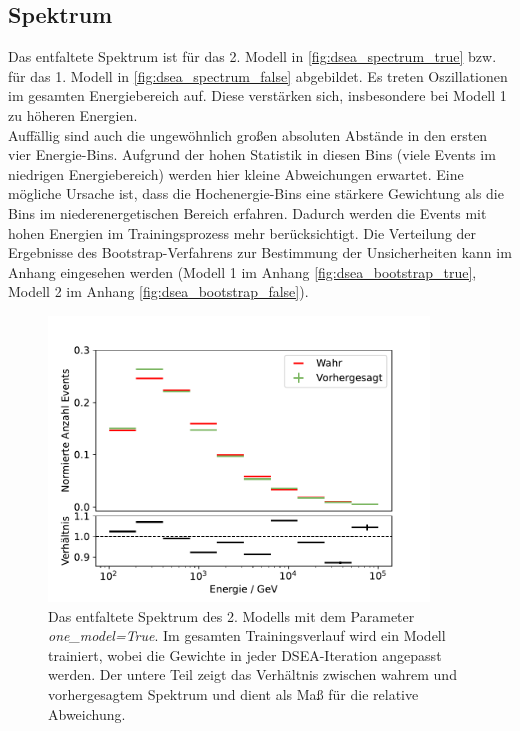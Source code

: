 \subsection{Spektrum} \label{sec:dsea_spectrum}
Das entfaltete Spektrum ist für das 2. Modell in \autoref{fig:dsea_spectrum_true} bzw. für das 1. Modell in \autoref{fig:dsea_spectrum_false} abgebildet.
Es treten Oszillationen im gesamten Energiebereich auf.
Diese verstärken sich, insbesondere bei Modell 1 zu höheren Energien.
\\
Auffällig sind auch die ungewöhnlich großen absoluten Abstände in den ersten vier Energie-Bins.
Aufgrund der hohen Statistik in diesen Bins (viele Events im niedrigen Energiebereich) werden hier kleine Abweichungen erwartet.
Eine mögliche Ursache ist, dass die Hochenergie-Bins eine stärkere Gewichtung als die Bins im niederenergetischen Bereich erfahren.
Dadurch werden die Events mit hohen Energien im Trainingsprozess mehr berücksichtigt.
Die Verteilung der Ergebnisse des Bootstrap-Verfahrens zur Bestimmung der Unsicherheiten kann im Anhang eingesehen werden (Modell 1 im Anhang \ref{fig:dsea_bootstrap_true}, Modell 2 im Anhang \ref{fig:dsea_bootstrap_false}).
\begin{figure}
    \centering
    \includegraphics[width=0.9\textwidth]{Plots/DSEA/True/spectrum_dist_10bins_60ep_500000samples_200pulls.pdf}
    \caption[Spektrum des 2. Modells in DSEA]{Das entfaltete Spektrum des 2. Modells mit dem Parameter \textit{one\_model=True}.
    Im gesamten Trainingsverlauf wird ein Modell trainiert, wobei die Gewichte in jeder DSEA-Iteration angepasst werden.
    Der untere Teil zeigt das Verhältnis zwischen wahrem und vorhergesagtem Spektrum und dient als Maß für die relative Abweichung.
    }
    \label{fig:dsea_spectrum_true}
\end{figure}

